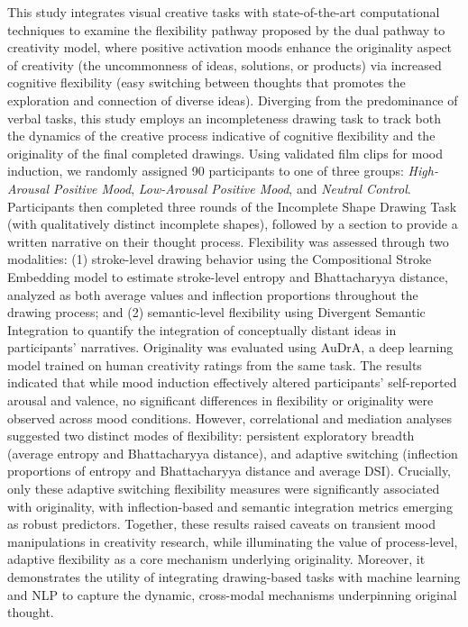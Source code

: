 \documentclass[../MA_Thesis.tex]{subfiles}
\begin{document}
This study integrates visual creative tasks with state-of-the-art computational techniques to examine the flexibility pathway proposed by the dual pathway to creativity model, where positive activation moods enhance the originality aspect of creativity (the uncommonness of ideas, solutions, or products) via increased cognitive flexibility (easy switching between thoughts that promotes the exploration and connection of diverse ideas). Diverging from the predominance of verbal tasks, this study employs an incompleteness drawing task to track both the dynamics of the creative process indicative of cognitive flexibility and the originality of the final completed drawings. Using validated film clips for mood induction, we randomly assigned 90 participants to one of three groups: \textit{High-Arousal Positive Mood}, \textit{Low-Arousal Positive Mood}, and \textit{Neutral Control}. Participants then completed three rounds of the Incomplete Shape Drawing Task (with qualitatively distinct incomplete shapes), followed by a section to provide a written narrative on their thought process. Flexibility was assessed through two modalities: (1) stroke-level drawing behavior using the Compositional Stroke Embedding model to estimate stroke-level entropy and Bhattacharyya distance, analyzed as both average values and inflection proportions throughout the drawing process; and (2) semantic-level flexibility using Divergent Semantic Integration to quantify the integration of conceptually distant ideas in participants’ narratives. Originality was evaluated using AuDrA, a deep learning model trained on human creativity ratings from the same task. The results indicated that while mood induction effectively altered participants’ self-reported arousal and valence, no significant differences in flexibility or originality were observed across mood conditions. However, correlational and mediation analyses suggested two distinct modes of flexibility: persistent exploratory breadth (average entropy and Bhattacharyya distance), and adaptive switching (inflection proportions of entropy and Bhattacharyya distance and average DSI). Crucially, only these adaptive switching flexibility measures were significantly associated with originality, with inflection-based and semantic integration metrics emerging as robust predictors. Together, these results raised caveats on transient mood manipulations in creativity research, while illuminating the value of process-level, adaptive flexibility as a core mechanism underlying originality. Moreover, it demonstrates the utility of integrating drawing-based tasks with machine learning and NLP to capture the dynamic, cross-modal mechanisms underpinning original thought.
\end{document}
